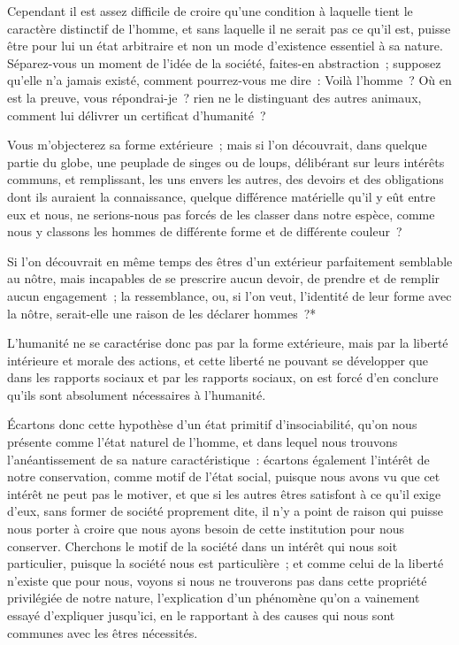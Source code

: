 \documentclass[french,twoside]{book} %
\newcommand\chapterclose{} %
\begin{document}
Cependant il est assez difficile de croire qu’une condition à laquelle tient le caractère distinctif de l’homme, et sans laquelle il ne serait pas ce qu’il est, puisse être pour lui un état arbitraire et non un mode d’existence essentiel à sa nature. Séparez-vous un moment de l’idée de la société, faites-en abstraction ; supposez qu’elle n’a jamais existé, comment pourrez-vous me dire : Voilà l’homme ? Où en est la preuve, vous répondrai-je ? rien ne le distinguant des autres animaux, comment lui délivrer un certificat d’humanité ?\par
Vous m’objecterez sa forme extérieure ; mais si l’on découvrait, dans quelque partie du globe, une peuplade de singes ou de loups, délibérant sur leurs intérêts communs, et remplissant, les uns envers les autres, des devoirs et des obligations dont ils auraient la connaissance, quelque différence matérielle qu’il y eût entre eux et nous, ne serions-nous pas forcés de les classer dans notre espèce, comme nous y classons les hommes de différente forme et de différente couleur ?\par
Si l’on découvrait en même temps des êtres d’un extérieur parfaitement semblable au nôtre, mais incapables de se prescrire aucun devoir, de prendre et de remplir aucun engagement ; la ressemblance, ou, si l’on veut, l’identité de leur forme avec la nôtre, serait-elle une raison de les déclarer hommes ?*\par
L’humanité ne se caractérise donc pas par la forme extérieure, mais par la liberté intérieure et morale des actions, et cette liberté ne pouvant se développer que dans les rapports sociaux et par les rapports sociaux, on est forcé d’en conclure qu’ils sont absolument nécessaires à l’humanité.\par
Écartons donc cette hypothèse d’un état primitif d’insociabilité, qu’on nous présente comme l’état naturel de l’homme, et dans lequel nous trouvons l’anéantissement de sa nature caractéristique : écartons également l’intérêt de notre conservation, comme motif de l’état social, puisque nous avons vu que cet intérêt ne peut pas le motiver, et que si les autres êtres satisfont à ce qu’il exige d’eux, sans former de société proprement dite, il n’y a point de raison qui puisse nous porter à croire que nous ayons besoin de cette institution pour nous conserver. Cherchons le motif de la société dans un intérêt qui nous soit particulier, puisque la société nous est particulière ; et comme celui de la liberté n’existe que pour nous, voyons si nous ne trouverons pas dans cette propriété privilégiée de notre nature, l’explication d’un phénomène qu’on a vainement essayé d’expliquer jusqu’ici, en le rapportant à des causes qui nous sont communes avec les êtres nécessités.
\chapterclose
\end{document}
